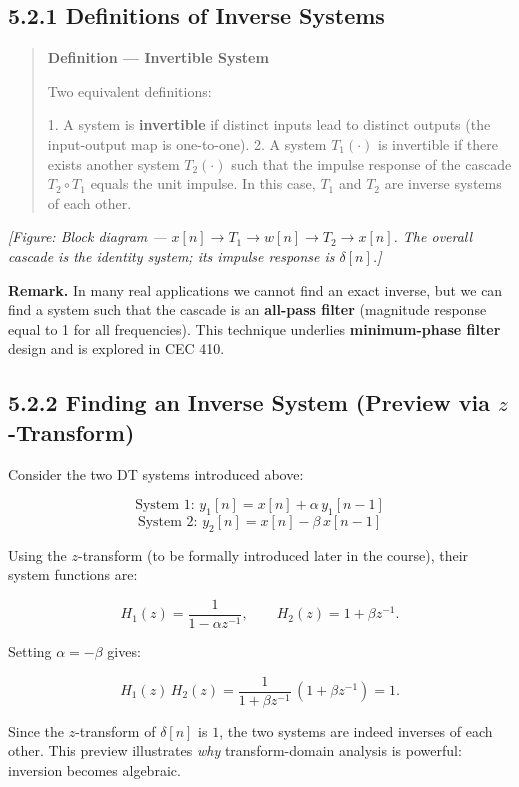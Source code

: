 \documentclass[11pt]{article}
\begin{document}
\subsection*{5.2.1 Definitions of Inverse Systems}

\begin{quote}
\textbf{Definition — Invertible System}

Two equivalent definitions:

1. A system is \textbf{invertible} if distinct inputs lead to distinct outputs (the input-output map is one-to-one).
2. A system $T_1(\cdot)$ is invertible if there exists another system $T_2(\cdot)$ such that the impulse response of the cascade $T_2\!\circ\!T_1$ equals the unit impulse. In this case, $T_1$ and $T_2$ are inverse systems of each other.
\end{quote}

\textit{[Figure: Block diagram — $x[n] \to T_1 \to w[n] \to T_2 \to x[n]$. The overall cascade is the identity system; its impulse response is $\delta[n]$.]}

\textbf{Remark.} In many real applications we cannot find an exact inverse, but we can find a system such that the cascade is an \textbf{all-pass filter} (magnitude response equal to 1 for all frequencies). This technique underlies \textbf{minimum-phase filter} design and is explored in CEC 410.

\subsection*{5.2.2 Finding an Inverse System (Preview via $z$-Transform)}

Consider the two DT systems introduced above:

\[\text{System 1: } y_1[n] = x[n] + \alpha\,y_1[n-1]\]
\[\text{System 2: } y_2[n] = x[n] - \beta\,x[n-1]\]

Using the $z$-transform (to be formally introduced later in the course), their system functions are:

\[H_1(z) = \frac{1}{1 - \alpha z^{-1}}, \qquad H_2(z) = 1 + \beta z^{-1}.\]

Setting $\alpha = -\beta$ gives:

\[H_1(z)\,H_2(z) = \frac{1}{1 + \beta z^{-1}}\,(1 + \beta z^{-1}) = 1.\]

Since the $z$-transform of $\delta[n]$ is $1$, the two systems are indeed inverses of each other. This preview illustrates \textit{why} transform-domain analysis is powerful: inversion becomes algebraic.
\end{document}
